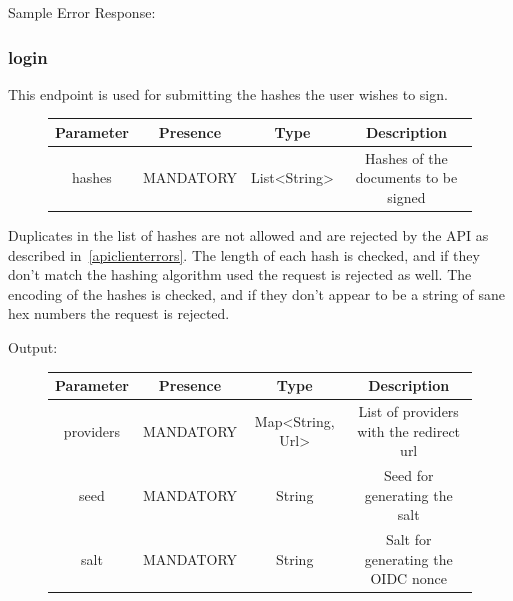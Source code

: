 Sample Error Response:


\subsubsection{login}
This endpoint is used for submitting the hashes the user wishes to sign.

\begin{figure}[H]
    \begin{center}
        \begin{tabular}{c|c|c|c}
            \textbf{Parameter} & \textbf{Presence} & \textbf{Type} & \textbf{Description} \\
            \hline
            hashes & MANDATORY & List<String> & Hashes of the documents to be signed \\
        \end{tabular}
    \end{center}
\end{figure}

Duplicates in the list of hashes are not allowed and are rejected by the API as described in~\ref{apiclienterrors}.
The length of each hash is checked, and if they don't match the hashing algorithm used the request is rejected as well.
The encoding of the hashes is checked, and if they don't appear to be a string of sane hex numbers the request is rejected.

Output:

\begin{figure}[H]
    \begin{center}
        \begin{tabular}{c|c|c|c}
            \textbf{Parameter} & \textbf{Presence} & \textbf{Type} & \textbf{Description} \\
            \hline
            providers & MANDATORY & Map<String, Url> & List of providers with the redirect url \\
            \hline
            seed & MANDATORY & String & Seed for generating the salt \\
            \hline
            salt & MANDATORY & String & Salt for generating the OIDC nonce \\
        \end{tabular}
    \end{center}
\end{figure}

